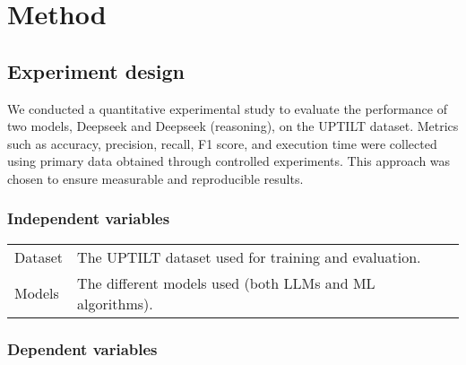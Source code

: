 \section{Method}
%
%
%

\subsection{Experiment design}
%
%
%
We conducted a quantitative experimental study to evaluate the performance of two
models, Deepseek and Deepseek (reasoning), on the UPTILT dataset. Metrics such
as accuracy, precision, recall, F1 score, and execution time were collected
using primary data obtained through controlled experiments. This approach was chosen
to ensure measurable and reproducible results.

\subsubsection{Independent variables}
\begin{center}
    \begin{tabular}{| l | l |}
        Dataset & The UPTILT dataset used for training and evaluation.     \\
        Models  & The different models used (both LLMs and ML algorithms). \\
    \end{tabular}
\end{center}

\subsubsection{Dependent variables}

